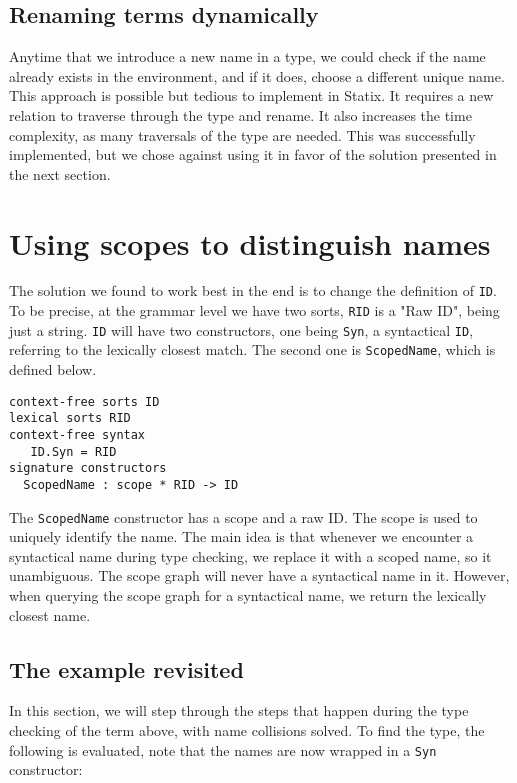 \subsection{Renaming terms dynamically}

Anytime that we introduce a new name in a type, we could check if the name already exists in the environment, and if it does, choose a different unique name. This approach is possible but tedious to implement in Statix. It requires a new relation to traverse through the type and rename. It also increases the time complexity, as many traversals of the type are needed. This was successfully implemented, but we chose against using it in favor of the solution presented in the next section.

\section{Using scopes to distinguish names}

The solution we found to work best in the end is to change the definition of \verb|ID|. To be precise, at the grammar level we have two sorts, \verb|RID| is a "Raw ID", being just a string. \verb|ID| will have two constructors, one being \verb|Syn|, a syntactical \verb|ID|, referring to the lexically closest match. The second one is \verb|ScopedName|, which is defined below.

\begin{lstlisting}
context-free sorts ID
lexical sorts RID
context-free syntax
   ID.Syn = RID
signature constructors
  ScopedName : scope * RID -> ID
\end{lstlisting}

The \verb|ScopedName| constructor has a scope and a raw ID. The scope is used to uniquely identify the name. The main idea is that whenever we encounter a syntactical name during type checking, we replace it with a scoped name, so it unambiguous. The scope graph will never have a syntactical name in it. However, when querying the scope graph for a syntactical name, we return the lexically closest name.

\subsection{The example revisited}

In this section, we will step through the steps that happen during the type checking of the term above, with name collisions solved. To find the type, the following is evaluated, note that the names are now wrapped in a \verb|Syn| constructor:

